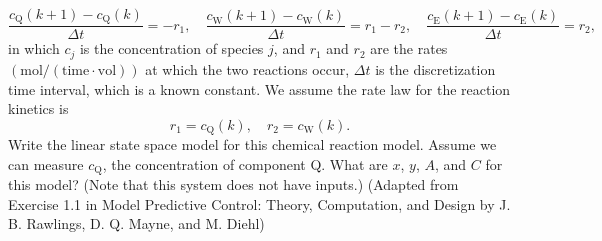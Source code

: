 \begin{equation*}
    \frac{c_\text{Q}(k+1) - c_\text{Q}(k)}{\Delta t}= -r_1,\quad\frac{c_\text{W}(k+1) - c_\text{W}(k)}{\Delta t} = r_1-r_2,\quad\frac{c_\text{E}(k+1) - c_\text{E}(k)}{\Delta t} = r_2,
\end{equation*}
in which $c_j$ is the concentration of species $j$, and $r_1$ and $r_2$ are the rates $(\text{mol}/(\text{time}\cdot \text{vol}))$ at which the two reactions occur, $\Delta t$ is the discretization time interval, which is a known constant. We assume the rate law for the reaction kinetics is
\begin{equation*}
    r_1 = c_\text{Q}(k),\quad r_2 = c_\text{W}(k).
\end{equation*}
Write the linear state space model for this chemical reaction model. Assume we can measure $c_{\text{Q}}$, the concentration of component Q. What are $x$, $y$, $A$, and $C$ for this model? (Note that this system does not have inputs.) (Adapted from Exercise 1.1 in Model Predictive Control: Theory, Computation, and Design by J. B. Rawlings, D. Q. Mayne, and M. Diehl)

